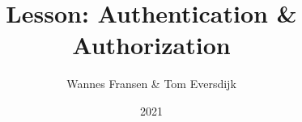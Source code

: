 \documentclass{beamer}
\title{Lesson: Authentication \& Authorization}
\author{Wannes Fransen \& Tom Eversdijk}
\institute{UC Leuven}
\date{2021}
\begin{document}
\frame{\titlepage}





% 
\end{document}
